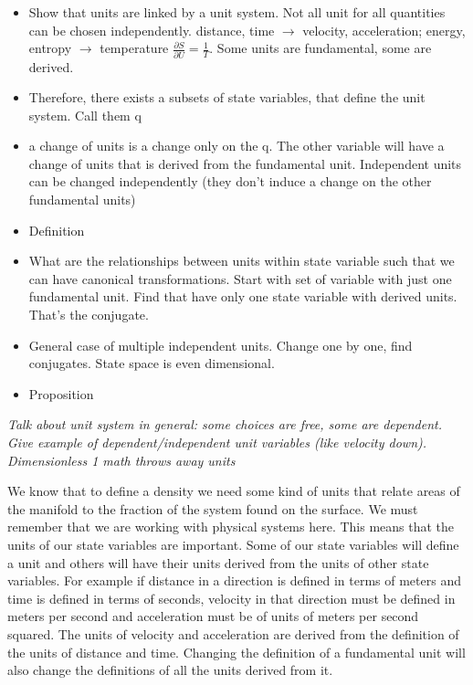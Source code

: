\documentclass{article}
\begin{document}
\begin{itemize}
	\item Show that units are linked by a unit system. Not all unit for all quantities can be chosen independently. distance, time $\to$ velocity, acceleration; energy, entropy $\to$ temperature $\frac{\partial{S}}{\partial U} = \frac{1}{T}$. Some units are fundamental, some are derived.
	
	\item Therefore, there exists a subsets of state variables, that define the unit system. Call them q
	
	\item a change of units is a change only on the q.  The other variable will have a change of units that is derived from the fundamental unit. Independent units can be changed independently (they don't induce a change on the other fundamental units)
	
	\item Definition
	
	\item What are the relationships between units within state variable such that we can have canonical transformations. Start with set of variable with just one fundamental unit. Find that have only one state variable with derived units. That's the conjugate.
	
	\item General case of multiple independent units. Change one by one, find conjugates. State space is even dimensional.
	
	\item Proposition
	
\end{itemize}

\emph{Talk about unit system in general: some choices are free, some are dependent. Give example of dependent/independent unit variables (like velocity down). Dimensionless 1 math throws away units}

	We know that to define a density we need some kind of units that relate areas of the manifold to the fraction of the system found on the surface. We must remember that we are working with physical systems here. This means that the units of our state variables are important. Some of our state variables will define a unit and others will have their units derived from the units of other state variables. For example if distance in a direction is defined in terms of meters and time is defined in terms of seconds, velocity in that direction must be defined in meters per second and acceleration must be of units of meters per second squared. The units of velocity and acceleration are derived from the definition of the units of distance and time. Changing the definition of a fundamental unit will also change the definitions of all the units derived from it. 
	
\end{document}

